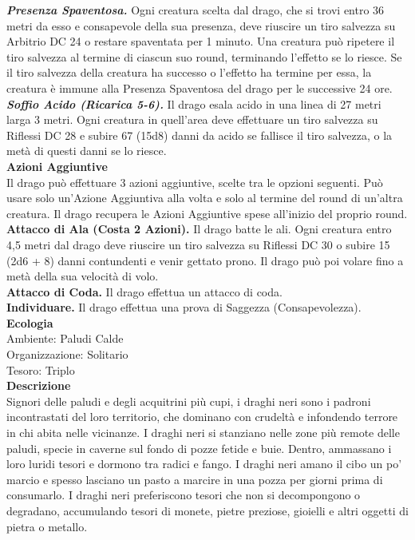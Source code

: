 \begin{multicols}{2}
\emph{\textbf{Presenza Spaventosa.}} Ogni creatura scelta dal drago, che si trovi entro 36 metri da esso e consapevole della sua presenza, deve riuscire un tiro salvezza su Arbitrio DC  24 o restare spaventata per 1 minuto. Una creatura può ripetere il tiro salvezza al termine di ciascun suo round, terminando l'effetto se lo riesce. Se il tiro salvezza della creatura ha successo o l'effetto ha termine per essa, la creatura è immune alla Presenza Spaventosa del drago per le successive 24 ore.\\
\emph{\textbf{Soffio Acido (Ricarica 5-6).}} Il drago esala acido in una linea di 27 metri larga 3 metri. Ogni creatura in quell'area deve effettuare un tiro salvezza su Riflessi DC  28 e subire 67 (15d8) danni da acido se fallisce il tiro salvezza, o la metà di questi danni se lo riesce.\\
\textbf{Azioni Aggiuntive}\\
Il drago può effettuare 3 azioni aggiuntive, scelte tra le opzioni seguenti. Può usare solo un'Azione Aggiuntiva alla volta e solo al termine del round di un'altra creatura. Il drago recupera le Azioni Aggiuntive spese all'inizio del proprio round.\\
\textbf{Attacco di Ala (Costa 2 Azioni).} Il drago batte le ali. Ogni creatura entro 4,5 metri dal drago deve riuscire un tiro salvezza su Riflessi DC  30 o subire 15 (2d6 + 8) danni contundenti e venir gettato prono. Il drago può poi volare fino a metà della sua velocità di volo.\\
\textbf{Attacco di Coda.} Il drago effettua un attacco di coda.  \\
\textbf{Individuare.} Il drago effettua una prova di Saggezza (Consapevolezza).\\
\textbf{Ecologia}\\
Ambiente: Paludi Calde\\
Organizzazione: Solitario\\
Tesoro: Triplo\\
\textbf{Descrizione}\\
Signori delle paludi e degli acquitrini più cupi, i draghi neri sono i padroni incontrastati del loro territorio, che dominano con crudeltà e infondendo terrore in chi abita nelle vicinanze. I draghi neri si stanziano nelle zone più remote delle paludi, specie in caverne sul fondo di pozze fetide e buie. Dentro, ammassano i loro luridi tesori e dormono tra radici e fango. I draghi neri amano il cibo un po’ marcio e spesso lasciano un pasto a marcire in una pozza per giorni prima di consumarlo. I draghi neri preferiscono tesori che non si decompongono o degradano, accumulando tesori di monete, pietre preziose, gioielli e altri oggetti di pietra o metallo.\\


\end{multicols}
